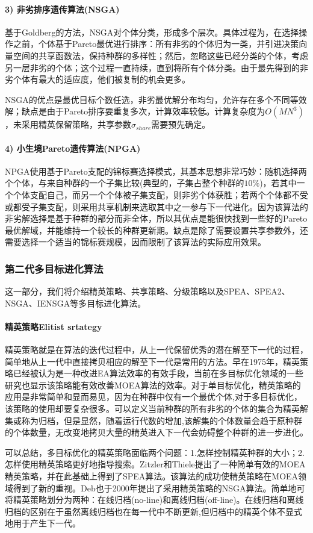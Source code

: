             \paragraph{3) 非劣排序遗传算法(NSGA)}
            基于Goldberg的方法，NSGA对个体分类，形成多个层次。具体过程为，在选择操作之前，个体基于Pareto最优进行排序：所有非劣的个体归为一类，并引进决策向量空间的共享函数法，保持种群的多样性；然后，忽略这些已经分类的个体，考虑另一层非劣的个体；这个过程一直持续，直到将所有个体分类。由于最先得到的非劣个体有最大的适应度，他们被复制的机会更多。
            \par
            NSGA的优点是最优目标个数任选，非劣最优解分布均匀，允许存在多个不同等效解；缺点是由于Pareto排序要重复多次，计算效率较低。计算复杂度为$O(MN^3)$，未采用精英保留策略，共享参数$\sigma_{share}$需要预先确定。
            \paragraph{4) 小生境Pareto遗传算法(NPGA)}
            NPGA使用基于Pareto支配的锦标赛选择模式，其基本思想非常巧妙：随机选择两个个体，与来自种群的一个子集比较(典型的，子集占整个种群的$10\%$)，若其中一个个体支配自己，而另一个个体被子集支配，则非劣个体获胜；若两个个体都不受或都受子集支配，则采用共享机制来选取其中之一参与下一代进化。因为该算法的非劣解选择是基于种群的部分而非全体，所以其优点是能很快找到一些好的Pareto最优解域，并能维持一个较长的种群更新期。缺点是除了需要设置共享参数外，还需要选择一个适当的锦标赛规模，因而限制了该算法的实际应用效果。
        \subsubsection{第二代多目标进化算法}
            \par
            这一部分，我们将介绍精英策略、共享策略、分级策略以及SPEA、SPEA2、NSGA、IENSGA等多目标进化算法。
            \paragraph{精英策略Elitist srtategy}精英策略就是在算法的迭代过程中，从上一代保留优秀的潜在解至下一代的过程，简单地从上一代中直接拷贝相应的解至下一代是常用的方法。早在1975年，精英策略已经被认为是一种改进EA算法效率的有效手段，当前在多目标优化领域的一些研究也显示该策略能有效改善MOEA算法的效率。对于单目标优化，精英策略的应用是非常简单和显而易见，因为在种群中仅有一个最优个体,对于多目标优化，该策略的使用却要复杂很多。可以定义当前种群的所有非劣的个体的集合为精英解集或称为归档，但是显然，随着运行代数的增加,该解集的个体数量会趋于原种群的个体数量，无改变地拷贝大量的精英进入下一代会妨碍整个种群的进一步进化。
            \par
            可以总结，多目标优化的精英策略面临两个问题：1.怎样控制精英种群的大小；2.怎样使用精英策略更好地指导搜索。Zitzler和Thiele提出了一种简单有效的MOEA精英策略，并在此基础上得到了SPEA算法。该算法的成功使精英策略在MOEA领域得到了新的重视。Deb也于2000年提出了采用精英策略的NSGA算法。简单地可将精英策略划分为两种：在线归档(no-line)和离线归档(off-line)。在线归档和离线归档的区别在于虽然离线归档也在每一代中不断更新,但归档中的精英个体不显式地用于产生下一代。

